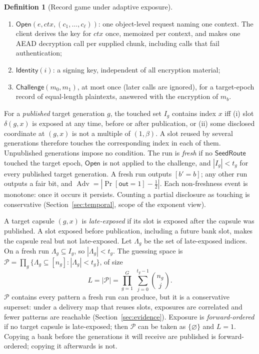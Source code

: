 \documentclass[pdflatex,sn-mathphys-num]{sn-jnl}%
\theoremstyle{plain}
\theoremstyle{definition}
\newtheorem{definition}[theorem]{Definition}
\newcommand{\Adv}{\operatorname{Adv}}
\begin{document}
\begin{definition}[Record game under adaptive exposure]
\begin{enumerate}
\item $\mathsf{Open}(e,\mathit{ctx},(c_1,\dots,c_\ell))$: one object-level request naming one context. The client derives the key for $\mathit{ctx}$ once, memoized per context, and makes one AEAD decryption call per supplied chunk, including calls that fail authentication;
\item $\mathsf{Identity}(i)$: a signing key, independent of all encryption material;
\item $\mathsf{Challenge}(m_0,m_1)$, at most once (later calls are ignored), for a target-epoch record of equal-length plaintexts, answered with the encryption of $m_b$.
\end{enumerate}
For a \emph{published} target generation $g$, the touched set $I_g$ contains index $x$ iff (i) slot $\delta(g,x)$ is exposed at any time, before or after publication, or (ii) some disclosed coordinate at $(g,x)$ is not a multiple of $(1,\beta)$. A slot reused by several generations therefore touches the corresponding index in each of them. Unpublished generations impose no condition. The run is \emph{fresh} if no $\mathsf{SeedRoute}$ touched the target epoch, $\mathsf{Open}$ is not applied to the challenge, and $|I_g|<t_g$ for every published target generation. A fresh run outputs $[b'=b]$; any other run outputs a fair bit, and $\Adv=|\Pr[\mathsf{out}=1]-\tfrac12|$. Each non-freshness event is monotone: once it occurs it persists. Counting a partial disclosure as touching is conservative (Section~\ref{sec:temporal}, scope of the exponent view).
\end{definition}

A target capsule $(g,x)$ is \emph{late-exposed} if its slot is exposed after the capsule was published. A slot exposed before publication, including a future bank slot, makes the capsule real but not late-exposed. Let $\Lambda_g$ be the set of late-exposed indices. On a fresh run $\Lambda_g\subseteq I_g$, so $|\Lambda_g|<t_g$. The guessing space is $\mathcal P=\prod_g\{\Lambda_g\subseteq[n_g]:|\Lambda_g|<t_g\}$, of size
\begin{equation}\label{eq:L}
 L=|\mathcal P|=\prod_{g=1}^{G}\ \sum_{j=0}^{t_g-1}\binom{n_g}{j}.
\end{equation}
$\mathcal P$ contains every pattern a fresh run can produce, but it is a conservative superset: under a delivery map that reuses slots, exposures are correlated and fewer patterns are reachable (Section~\ref{sec:evidence}). Exposure is \emph{forward-ordered} if no target capsule is late-exposed; then $\mathcal P$ can be taken as $\{\varnothing\}$ and $L=1$. Copying a bank before the generations it will receive are published is forward-ordered; copying it afterwards is not.
\end{document}
